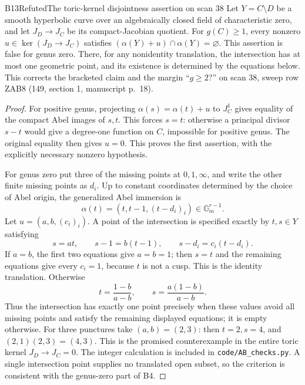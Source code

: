 \begin{result}{B13}{Refuted}{The toric-kernel disjointness assertion on scan 38}
\label{res:B13}
Let $Y=C\setminus D$ be a smooth hyperbolic curve over an algebraically
closed field of characteristic zero, and let $J_D\to J_C$ be its
compact-Jacobian quotient. For $g(C)\geq1$, every nonzero
$u\in\ker(J_D\to J_C)$ satisfies
$(\alpha(Y)+u)\cap\alpha(Y)=\varnothing$.
This assertion is false for genus zero. There, for any nonidentity
translation, the intersection has at most one geometric point, and
its existence is determined by the equations below. This corrects
the bracketed claim and the margin ``$g\geq2$?'' on scan 38,
sweep row ZAB8 (149, section 1, manuscript p.~18).
\end{result}
\begin{proof}
For positive genus, projecting $\alpha(s)=\alpha(t)+u$ to $J_C^1$
gives equality of the compact Abel images of $s,t$. This forces
$s=t$: otherwise a principal divisor $s-t$ would give a degree-one
function on $C$, impossible for positive genus. The original equality
then gives $u=0$. This proves the first assertion, with the explicitly
necessary nonzero hypothesis.

For genus zero put three of the missing points at $0,1,\infty$, and
write the other finite missing points as $d_i$. Up to constant
coordinates determined by the choice of Abel origin, the generalized
Abel immersion is
\[
 \alpha(t)=(t,t-1,(t-d_i)_i)\in\mathbb G_m^{r-1}.
\]
Let $u=(a,b,(c_i)_i)$. A point of the intersection is specified exactly
by $t,s\in Y$ satisfying
\[
 s=at,\qquad s-1=b(t-1),\qquad s-d_i=c_i(t-d_i).
\]
If $a=b$, the first two equations give $a=b=1$; then $s=t$ and the
remaining equations give every $c_i=1$, because $t$ is not a cusp.
This is the identity translation. Otherwise
\[
 t=\frac{1-b}{a-b},\qquad s=\frac{a(1-b)}{a-b}.
\]
Thus the intersection has exactly one point precisely when these
values avoid all missing points and satisfy the remaining displayed
equations; it is empty otherwise. For three punctures take
$(a,b)=(2,3)$: then $t=2,s=4$, and
$(2,1)(2,3)=(4,3)$. This is the promised counterexample in the
entire toric kernel $J_D\to J_C=0$. The integer calculation is
included in \texttt{code/AB\_checks.py}. A single intersection
point supplies no translated open subset, so the criterion is
consistent with the genus-zero part of B4.
\end{proof}
